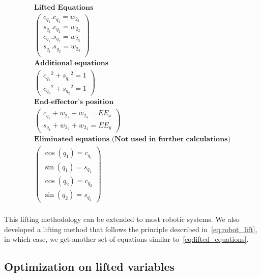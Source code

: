 \begin{equation}
\begin{array}{c}
  \textbf{Lifted Equations}\\
  \left(\begin{array}{cc}
    c_{q_1}.c_{q_2} = w_{2_1}\\
    s_{q_1}.c_{q_2} = w_{2_2}\\
    c_{q_1}.s_{q_2} = w_{2_3}\\
    s_{q_1}.s_{q_2} = w_{2_4}\\
  \end{array}\right)\\
  \textbf{Additional equations}\\
  \left(\begin{array}{c}
    {c_{q_1}}^2 + {s_{q_1}}^2 = 1\\
    {c_{q_2}}^2 + {s_{q_2}}^2 = 1
  \end{array}\right)\\
  \textbf{End-effector's position}\\
  \left(\begin{array}{c}
    c_{q_1} + w_{2_1} - w_{2_4} = EE_x\\
    s_{q_1} + w_{2_2} + w_{2_3} = EE_y
  \end{array}\right)\\
  \textbf{Eliminated equations (Not used in further calculations)}\\
  \left(\begin{array}{c}
    \cos(q_1)  =  c_{q_1} \\
    \sin(q_1)  =  s_{q_1} \\
    \cos(q_2)  =  c_{q_2} \\
    \sin(q_2)  =  s_{q_2}
  \end{array}\right)\\
\end{array}
\label{eq:lifted_equations_trigo}
\end{equation}

This lifting methodology can be extended to most robotic systems.
We also developed a lifting method that follows the principle described in~\ref{eq:robot_lift}, in which case, we get another set of equations similar to~\ref{eq:lifted_equations}.

\subsection{Optimization on lifted variables}
\label{subsec:optimization_on_lifted_variables}

